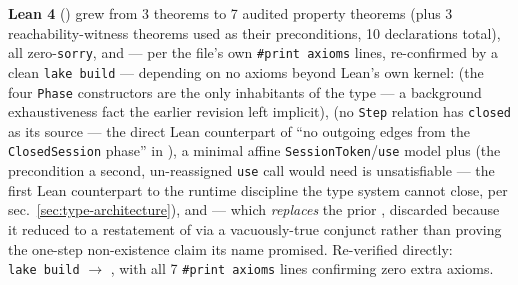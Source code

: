 \documentclass[
  english,
]{article}
\theoremstyle{definition}
\begin{document}
\textbf{Lean 4} () grew from 3
theorems to 7 audited property theorems (plus 3 reachability-witness
theorems used as their preconditions, 10 declarations total), all
zero-\texttt{sorry}, and --- per the file's own \texttt{\#print\ axioms}
lines, re-confirmed by a clean \texttt{lake\ build} --- depending on no
axioms beyond Lean's own kernel:  (the four
\texttt{Phase} constructors are the only inhabitants of the type --- a
background exhaustiveness fact the earlier revision left implicit),
 (no \texttt{Step} relation has
\texttt{closed} as its source --- the direct Lean counterpart of ``no
outgoing edges from the \texttt{ClosedSession} phase'' in
), a minimal affine
\texttt{SessionToken}/\texttt{use} model plus
 (the precondition a second,
un-reassigned \texttt{use} call would need is unsatisfiable --- the
first Lean counterpart to the runtime 
discipline the type system cannot close, per
sec.~\ref{sec:type-architecture}), and
 --- which \emph{replaces} the
prior , discarded because it reduced
to a restatement of  via a
vacuously-true  conjunct rather than proving
the one-step non-existence claim its name promised. Re-verified
directly: \texttt{lake\ build} \texorpdfstring{\ensuremath{\to}}{->}
, with all 7
\texttt{\#print\ axioms} lines confirming zero extra axioms.
\end{document}
